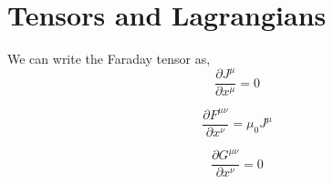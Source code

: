 \chapter{Tensors and Lagrangians}
We can write the Faraday tensor as,
\begin{equation}
\frac{\partial J^{\mu}}{\partial x^{\mu}} = 0
\end{equation}

\begin{equation}
\frac{\partial F^{\mu \nu}}{\partial x^{\nu}} = \mu_{0}J^{\mu}
\end{equation}

\begin{equation}
\frac{\partial G^{\mu \nu}}{\partial x^{\nu}} = 0
\end{equation}